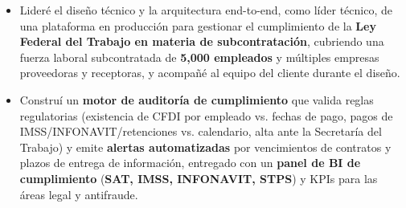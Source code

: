 {
\begin{itemize}
    \item Lideré el diseño técnico y la arquitectura end-to-end, como líder técnico, de una plataforma en producción para gestionar el cumplimiento de la \textbf{Ley Federal del Trabajo en materia de subcontratación}, cubriendo una fuerza laboral subcontratada de \textbf{5{,}000 empleados} y múltiples empresas proveedoras y receptoras, y acompañé al equipo del cliente durante el diseño.
    \item Construí un \textbf{motor de auditoría de cumplimiento} que valida reglas regulatorias (existencia de CFDI por empleado vs. fechas de pago, pagos de IMSS/INFONAVIT/retenciones vs. calendario, alta ante la Secretaría del Trabajo) y emite \textbf{alertas automatizadas} por vencimientos de contratos y plazos de entrega de información, entregado con un \textbf{panel de BI de cumplimiento} (\textbf{SAT, IMSS, INFONAVIT, STPS}) y KPIs para las áreas legal y antifraude.
\end{itemize}
}

